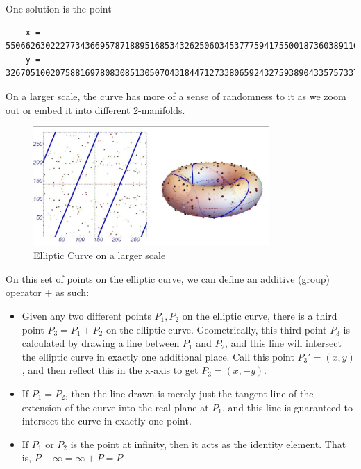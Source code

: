 \documentclass{article}
\begin{document}
    One solution is the point

    \begin{lstlisting}
    x = 55066263022277343669578718895168534326250603453777594175500187360389116729240
    y = 32670510020758816978083085130507043184471273380659243275938904335757337482424
    \end{lstlisting}

    On a larger scale, the curve has more of a sense of randomness to it as we zoom out or embed it into different 2-manifolds.

    \begin{figure}[H]
    \centering
    \includegraphics[width=0.8\textwidth]{img/Elliptic_Curve_Cryptography_data_points_doughnut.png}
    \caption{Elliptic Curve on a larger scale}
    \end{figure}

    On this set of points on the elliptic curve, we can define an additive (group) operator $+$ as such:

    \begin{itemize}
      \item Given any two different points $P_1, P_2$ on the elliptic curve, there is a third point $P_3 = P_1 + P_2$ on the elliptic curve. Geometrically, this third point $P_3$ is calculated by drawing a line between $P_1$ and $P_2$, and this line will intersect the elliptic curve in exactly one additional place. Call this point $P_3' = (x,y)$, and then reflect this in the x-axis to get $P_3 = (x,-y)$.
      \item If $P_1 = P_2$, then the line drawn is merely just the tangent line of the extension of the curve into the real plane at $P_1$, and this line is guaranteed to intersect the curve in exactly one point.
      \item If $P_1$ or $P_2$ is the point at infinity, then it acts as the identity element. That is, $P + \infty = \infty + P = P$
    \end{itemize}
\end{document}
